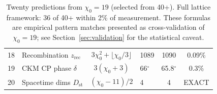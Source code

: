 \documentclass[12pt,a4paper]{article}
\newcommand{\chizero}{\chi_0}
\newcommand{\Dst}{D_{\mathrm{st}}}
\begin{document}
\begin{table}[h]
\begin{tabular}{clclcc}
18 & Recombination $z_{\mathrm{rec}}$ & $3\chizero^2 + \lfloor\chizero/3\rfloor$ & 1089 & 1090 & 0.09\% \\
19 & CKM CP phase $\delta$ & $3(\chizero\!+\!3)$ & 66$^\circ$ & 65.8$^\circ$ & 0.3\% \\
20 & Spacetime dims $\Dst$ & $(\chizero\!-\!11)/2$ & 4 & 4 & EXACT \\
\bottomrule
\end{tabular}
\caption{Twenty predictions from $\chizero = 19$ (selected from 40+). Full lattice framework: 36 of 40+ within 2\% of measurement. These formulas are empirical pattern matches presented as cross-validation of $\chizero = 19$; see Section~\ref{sec:validation} for the statistical caveat.}
\label{tab:predictions}
\end{table}
\end{document}
